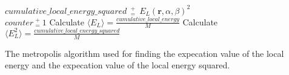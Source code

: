 \begin{algorithm}[h!]
{{{                $\textit{cumulative\_local\_energy\_squared}~~ ^+_= ~~E_L(\mathbf{r}, \alpha, \beta)^2$ \\ 
                $\textit{counter}~ ^+_= ~1$  
        }       
 }
Calculate $\langle E_L \rangle = \frac{\textit{cumulative\_local\_energy}}{M}$ \;
Calculate $\langle E_L^2 \rangle = \frac{\textit{cumulative\_local\_energy\_squared}}{M}$ \;
}
\caption{The metropolis algorithm used for finding the expecation value of the
local energy and the expecation value of the local energy squared.}
\label{alg:metropolis}
\end{algorithm}